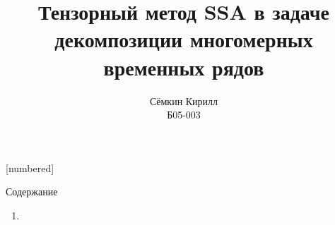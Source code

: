 
\usepackage[justification=centering, font=footnotesize]{caption}
[numbered]

\setlength{\parskip}{0.1cm}

\author{Сёмкин Кирилл \\ Б05-003}
\date{}
\title{Тензорный метод SSA в задаче декомпозиции многомерных временных рядов}


	
	\begin{frame}[c]
		\titlepage
	\end{frame}

	\begin{frame}{Содержание}
		
		\begin{enumerate}
			\item 
		\end{enumerate}
	
	\end{frame}

	
	
